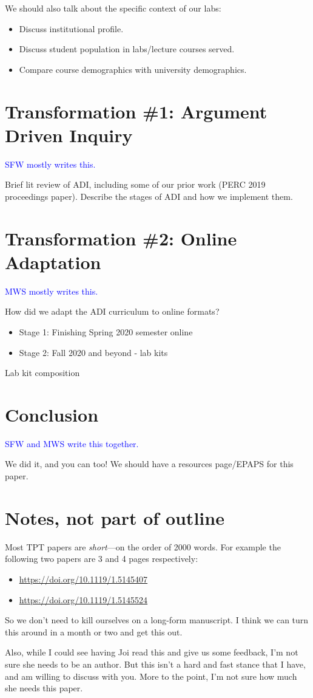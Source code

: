 \documentclass[aip, numerical, preprint]{revtex4-2}
\begin{document}
We should also talk about the specific context of our labs:
\begin{itemize}
  \item Discuss institutional profile.
  \item Discuss student population in labs/lecture courses served.
  \item Compare course demographics with university demographics.
\end{itemize}

\section{Transformation \#1: Argument Driven Inquiry}
\textcolor{blue}{SFW mostly writes this.}

Brief lit review of ADI, including some of our prior work (PERC 2019 proceedings paper).
Describe the stages of ADI and how we implement them.

\section{Transformation \#2: Online Adaptation}
\textcolor{blue}{MWS mostly writes this.}

How did we adapt the ADI curriculum to online formats?
\begin{itemize}
  \item Stage 1: Finishing Spring 2020 semester online
  \item Stage 2: Fall 2020 and beyond - lab kits
\end{itemize}
Lab kit composition

\section{Conclusion}
\textcolor{blue}{SFW and MWS write this together.}

We did it, and you can too!  We should have a resources page/EPAPS for this paper.

\section{Notes, not part of outline}
Most TPT papers are \emph{short}---on the order of 2000 words.  For example the following two
papers are 3 and 4 pages respectively:
\begin{itemize}
  \item \url{https://doi.org/10.1119/1.5145407}
  \item \url{https://doi.org/10.1119/1.5145524}
\end{itemize}
So we don't need to kill ourselves on a long-form manuscript.  I think we can turn this around
in a month or two and get this out.

Also, while I could see having Joi read this and give us some feedback, I'm not sure she needs
to be an author.  But this isn't a hard and fast stance that I have, and am willing to discuss
with you.  More to the point, I'm not sure how much she needs this paper.
\end{document}
